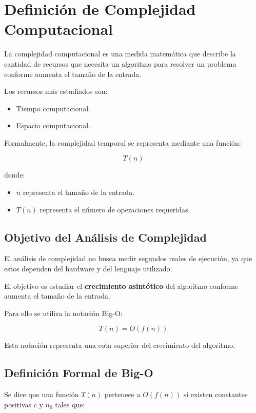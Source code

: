 \documentclass[12pt]{article}
\begin{document}
\section{Definición de Complejidad Computacional}

La complejidad computacional es una medida matemática que describe la cantidad de recursos que necesita un algoritmo para resolver un problema conforme aumenta el tamaño de la entrada.

Los recursos más estudiados son:

\begin{itemize}
    \item Tiempo computacional.
    \item Espacio computacional.
\end{itemize}

Formalmente, la complejidad temporal se representa mediante una función:

\[
T(n)
\]

donde:

\begin{itemize}
    \item \(n\) representa el tamaño de la entrada.
    \item \(T(n)\) representa el número de operaciones requeridas.
\end{itemize}

\subsection{Objetivo del Análisis de Complejidad}

El análisis de complejidad no busca medir segundos reales de ejecución, ya que estos dependen del hardware y del lenguaje utilizado.

El objetivo es estudiar el \textbf{crecimiento asintótico} del algoritmo conforme aumenta el tamaño de la entrada.

Para ello se utiliza la notación Big-O:

\[
T(n)=O(f(n))
\]

Esta notación representa una cota superior del crecimiento del algoritmo.

\subsection{Definición Formal de Big-O}

Se dice que una función \(T(n)\) pertenece a \(O(f(n))\) si existen constantes positivas \(c\) y \(n_0\) tales que:
\end{document}

